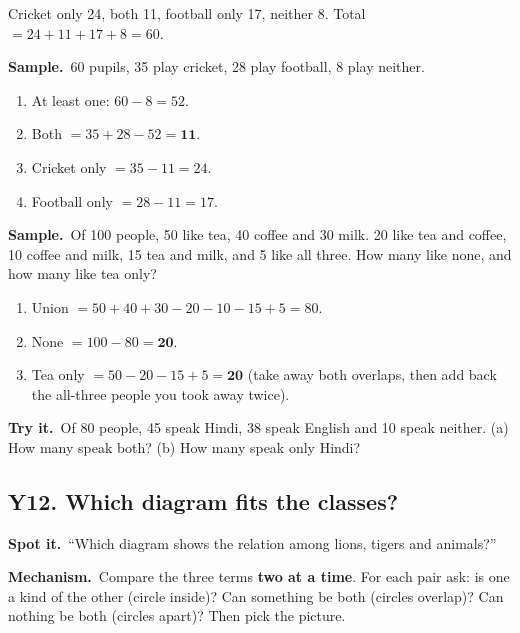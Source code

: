 \documentclass[11pt,a4paper]{article}
\let\oldsubsection\subsection
\renewcommand{\subsection}{\needspace{9\baselineskip}\oldsubsection}
\newcommand{\spot}{\textbf{\color{ember}Spot it.}\ }
\newcommand{\mech}{\textbf{\color{ember}Mechanism.}\ }
\newif\ifkeepsamp
\newcommand{\samp}{\ifkeepsamp\needspace{4\baselineskip}\fi\textbf{\color{ember}Sample.}\ }
\newcommand{\tryit}[1]{\textbf{\color{ember}Try it.}\ #1}
\begin{document}
\begin{center}
\par\nopagebreak\smallskip
{\small Cricket only 24, both 11, football only 17, neither 8. Total $=24+11+17+8=60$.}
\end{center}

\samp 60 pupils, 35 play cricket, 28 play football, 8 play neither.
\begin{enumerate}
\item At least one: $60 - 8 = 52$.
\item Both $=35 + 28 - 52 = \mathbf{11}$.
\item Cricket only $=35 - 11 = 24$.
\item Football only $=28 - 11 = 17$.
\end{enumerate}
\samp Of 100 people, 50 like tea, 40 coffee and 30 milk. 20 like tea and coffee, 10 coffee and milk, 15 tea and milk, and 5 like all three. How many like none, and how many like tea only?
\begin{enumerate}
\item Union $=50 + 40 + 30 - 20 - 10 - 15 + 5 = 80$.
\item None $=100 - 80 = \mathbf{20}$.
\item Tea only $=50 - 20 - 15 + 5 = \mathbf{20}$ (take away both overlaps, then add back the all-three people you took away twice).
\end{enumerate}

\tryit Of 80 people, 45 speak Hindi, 38 speak English and 10 speak neither. (a) How many speak both? (b) How many speak only Hindi?

\subsection{Y12. Which diagram fits the classes?}
\spot ``Which diagram shows the relation among lions, tigers and animals?''

\mech Compare the three terms \textbf{two at a time}. For each pair ask: is one a kind of the other (circle inside)? Can something be both (circles overlap)? Can nothing be both (circles apart)? Then pick the picture.
\end{document}
